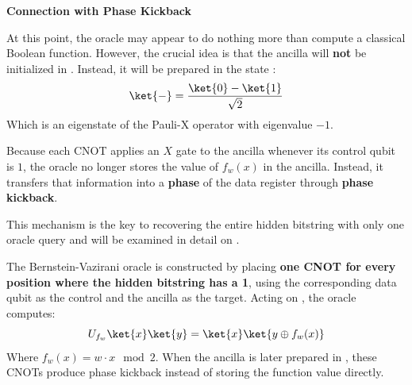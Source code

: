 \highspace
\begin{flushleft}
    \textcolor{Green3}{ \textbf{Connection with Phase Kickback}}
\end{flushleft}
At this point, the oracle may appear to do nothing more than compute a classical Boolean function. However, the crucial idea is that the ancilla will \textbf{not} be initialized in . Instead, it will be prepared in the state \ket{-}:
\begin{equation*}
    \ket{-} = \frac{\ket{0} - \ket{1}}{\sqrt{2}}
\end{equation*}
Which is an eigenstate of the Pauli-X operator with eigenvalue $-1$.

\highspace
Because each CNOT applies an $X$ gate to the ancilla whenever its control qubit is $1$, the oracle no longer stores the value of $f_w(x)$ in the ancilla. Instead, it transfers that information into a \textbf{phase} of the data register through \textbf{phase kickback}.

\highspace
This mechanism is the key to recovering the entire hidden bitstring with only one oracle query and will be examined in detail on .

\highspace
\begin{takeawaysbox}
    The Bernstein-Vazirani oracle is constructed by placing \textbf{one CNOT for every position where the hidden bitstring has a 1}, using the corresponding data qubit as the control and the ancilla as the target. Acting on , the oracle computes:
    \begin{equation*}
        U_{f_w} \ket{x} \ket{y} = \ket{x} \ket{y \oplus f_w (x)}
    \end{equation*}
    Where $f_w (x) = w \cdot x \mod 2$. When the ancilla is later prepared in \ket{-}, these CNOTs produce phase kickback instead of storing the function value directly.
\end{takeawaysbox}

